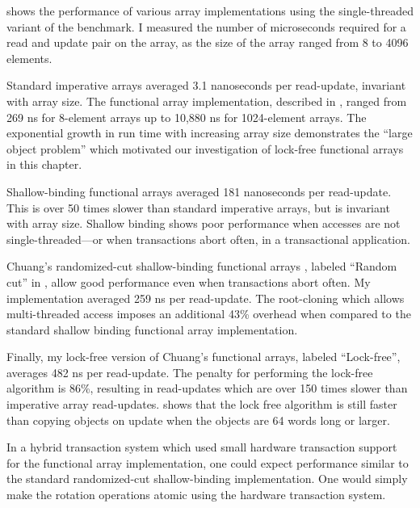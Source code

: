  shows the performance of various array
implementations using the single-threaded variant of the benchmark.
I measured the number of microseconds required for a read and update pair
on the array, as the size of the array ranged from 8 to 4096 elements.

Standard imperative arrays averaged 3.1 nanoseconds per read-update,
invariant with array size.  The \naive functional array
implementation, described in , ranged from 269 ns
for 8-element arrays up to 10,880 ns for 1024-element arrays.  The
exponential growth in run time with increasing array size demonstrates the
``large object problem'' which motivated our investigation of
lock-free functional arrays in this chapter.

Shallow-binding functional arrays \cite{Baker91} averaged 181
nanoseconds per read-update.  This is over 50 times slower than
standard imperative arrays, but is invariant with array size.
Shallow binding shows poor performance when accesses are not
single-threaded---or when transactions abort often, in a transactional
application.

Chuang's randomized-cut shallow-binding functional arrays
\cite{Chuang94}, labeled ``Random cut'' in ,
allow good performance even when transactions abort
often.  My implementation averaged 259 ns per read-update.  The
root-cloning which allows multi-threaded access imposes an additional
43\% overhead when compared to the standard shallow binding functional
array implementation.

Finally, my lock-free version of Chuang's functional arrays, labeled
``Lock-free'', averages
482 ns per read-update.  The penalty for performing the lock-free
algorithm is 86\%, resulting in read-updates which are over 150 times slower
than imperative array read-updates.    shows
that the lock free algorithm is still faster than copying objects on
update when the objects are 64 words long or larger.

In a hybrid transaction system which used small hardware transaction
support for the functional array implementation, one could expect
performance similar to the standard randomized-cut shallow-binding
implementation.  One would simply make the rotation operations atomic
using the hardware transaction system.




